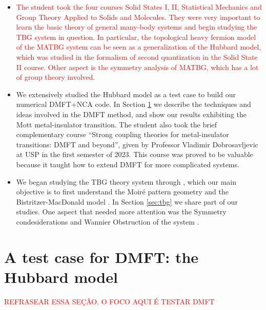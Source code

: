 \documentclass[12pt]{report}
\newcommand{\ALERT}[1]{\textcolor{red}{#1}}
\begin{document}
\begin{itemize}
\item \ALERT{The student took the four courses Solid States I, II, Statistical Mechanics and Group Theory Applied to Solids and Molecules. They were very important to learn the basic theory of general many-body systems and begin studying the TBG system in question. In particular, the topological heavy fermion model \cite{topoheavyfermion2022} of the MATBG system can be seen as a generalization of the Hubbard model, which was studied in the formalism of second quantization in the Solid State II course. Other aspect is the symmetry analysis of MATBG, which has a lot of group theory involved.}

\item We extensively studied the Hubbard model \cite{hubbard1963} as a test case to build our numerical DMFT+NCA code. In Section \ref{sec:hubbard} we describe the techniques and ideas involved in the DMFT method, and show our results exhibiting the Mott metal-insulator transition. The student also took the brief complementary course ``Strong coupling theories for metal-insulator transitions: DMFT and beyond'', given by Professor Vladimir Dobrosavljevic at USP in the first semester of 2023. This course was proved to be valuable because it taught how to extend DMFT for more complicated systems.

\item We began studying the TBG theory system through \cite{handbook2019}, which our main objective is to first understand the Moiré pattern geometry and the Bistritzer-MacDonald model \cite{macdonald2011}. In Section \ref{sec:tbg} we share part of our studies. One aspect that needed more attention was the Symmetry condesiderations and Wannier Obstruction of the system \cite{zou, thesis_rennella}.
\end{itemize}


\section{A test case for DMFT: the Hubbard model} \label{sec:hubbard}

\ALERT{REFRASEAR ESSA SEÇÃO. O FOCO AQUI É TESTAR DMFT}
\end{document}
